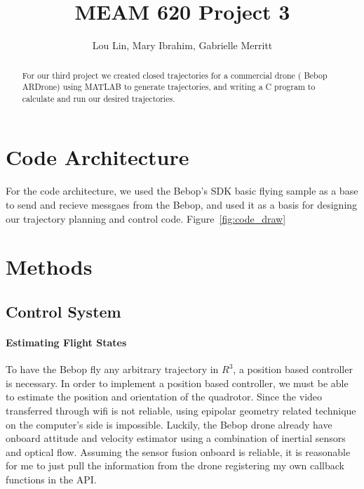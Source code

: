 \documentclass[english, twocolumn]{article}
\title{MEAM 620 Project 3}
\author{Lou Lin, Mary Ibrahim, Gabrielle Merritt}
\begin{document}
\maketitle

\begin{abstract}
For our third project we created closed trajectories for a commercial drone ( Bebop ARDrone) using MATLAB to generate trajectories, and writing a C program to calculate and run our desired trajectories. 

\end{abstract}
\section*{Code Architecture }
For the code architecture, we used the Bebop's SDK basic flying sample as a base to send and recieve messgaes from the Bebop, and used it as a basis for designing our trajectory planning and control code. Figure~\ref{fig:code_draw} 
\section*{Methods}
\subsection*{Control System}
\paragraph{Estimating Flight States}
To have the Bebop fly any arbitrary trajectory in $R^3$, a position based controller is necessary. In order to implement a position based controller, we must be able to estimate the position and orientation of the quadrotor. Since the video transferred through wifi is not reliable, using epipolar geometry related technique on the computer's side is impossible. Luckily, the Bebop drone already have onboard attitude and velocity estimator using a combination of inertial sensors and optical flow. Assuming the sensor fusion onboard is reliable, it is reasonable for me to just pull the information from the drone registering my own callback functions in the API. \\
 
\end{document}
